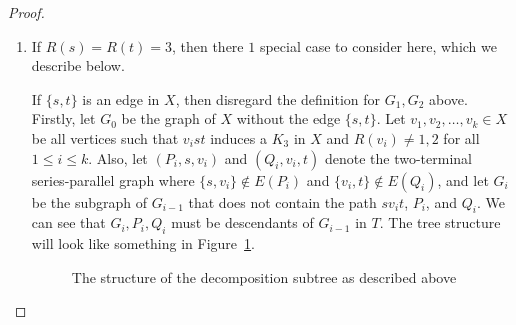 \documentclass{article}
\begin{document}
\begin{proof}
\begin{enumerate}[label=\textbf{Case \arabic*.},leftmargin=*]
\item If $R(s) = R(t) = 3$, then there $1$ special case to consider here, which we describe below.

If $\{s,t\}$ is an edge in $X$, then disregard the definition for $G_1, G_2$ above. Firstly, let $G_0$ be the graph of $X$ without the edge $\{s, t\}$. Let $v_1, v_2,\ldots,v_k \in X$ be all vertices such that $v_ist$ induces a $K_3$ in $X$ and $R(v_i) \neq 1, 2$ for all $1 \leq i \leq k$. Also, let $(P_i, s, v_i)$ and $(Q_i, v_i, t)$ denote the two-terminal series-parallel graph where $\{s,v_i\} \notin E(P_i)$ and $\{v_i,t\} \notin E(Q_i)$, and let $G_i$ be the subgraph of $G_{i - 1}$ that does not contain the path $sv_it$, $P_i$, and $Q_i$. We can see that $G_i, P_i, Q_i$ must be descendants of $G_{i - 1}$ in $T$. The tree structure will look like something in Figure~\ref{fig4}. %
\begin{figure}[!htb]
\begin{center}
\caption{The structure of the decomposition subtree as described above}\label{fig4}
\end{center}
\end{figure}
    

\end{enumerate}
\end{proof}
\end{document}
